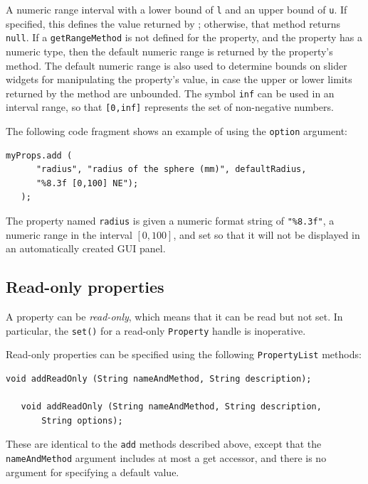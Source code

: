 \begin{description}
A numeric range interval with a lower bound of {\tt l} and an
upper bound of {\tt u}. If specified, this defines the value returned by
; 
otherwise, that method
returns {\tt null}. If a {\tt getRangeMethod} is not defined for the property,
and the property has a numeric type, then the default numeric range is
returned by the property's 
 method. The
default numeric range is also used to determine bounds on slider
widgets for manipulating the property's value, in case the upper or
lower limits returned by the 
 method are
unbounded.  The symbol {\tt inf} can be used in an interval range, so that
{\tt [0,inf]} represents the set of non-negative numbers.

\end{description}

The following code fragment shows an example of using the {\tt option}
argument:
\begin{lstlisting}[]
   myProps.add (
      "radius", "radius of the sphere (mm)", defaultRadius,
      "%8.3f [0,100] NE");
   );
\end{lstlisting}
The property named {\tt radius} is given a numeric format string of
{\tt "\%8.3f"}, a numeric range in the interval $[0, 100]$, and set so
that it will not be displayed in an automatically created GUI panel.

\subsection{Read-only properties}

A property can be {\it read-only}, which means that it can be read but
not set. In particular, the {\tt set()} for a read-only {\tt Property}
handle is inoperative.

Read-only properties can be specified using the following
{\tt PropertyList} methods:

\begin{lstlisting}[]
   void addReadOnly (String nameAndMethod, String description);

   void addReadOnly (String nameAndMethod, String description, 
       String options);
\end{lstlisting}
These are identical to the {\tt add} methods described above, except
that the {\tt nameAndMethod} argument includes at most a get accessor,
and there is no argument for specifying a default value.

